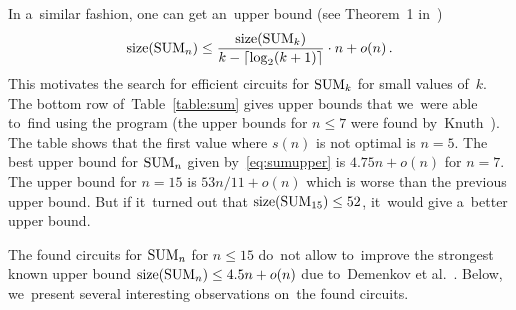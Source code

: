 In a~similar fashion, one can get an~upper bound (see Theorem~1 in~\cite{DBLP:conf/date/Kulikov18})
\begin{equation}\label{eq:sumupper}
\operatorname{size}(\operatorname{SUM}_n) \le \frac{\operatorname{size}(\operatorname{SUM}_k)}{k-\lceil \log_2(k+1) \rceil} \cdot n + o(n) \, .
\end{equation}
This motivates the search for efficient circuits
for $\operatorname{SUM}_k$ for small values of~$k$. The bottom row
of~Table~\ref{table:sum} gives upper bounds that
we~were able to~find using the program
(the upper bounds for $n \le 7$ were found
by~Knuth~\cite{Knuth:2008:ACP:1377542}).
The table shows that the first value where $s(n)$ is not
optimal is $n=5$. The best upper bound for $\operatorname{SUM}_n$ given
by~\eqref{eq:sumupper} is $4.75n+o(n)$ for $n=7$. The upper
bound for $n=15$ is $53n/11+o(n)$ which is worse than the
previous upper bound. But if it~turned out that
$\operatorname{size}(\operatorname{SUM}_{15}) \le 52$,
it~would give a~better upper bound.

The found circuits for $\operatorname{SUM}_n$ for $n \le 15$
do~not allow to~improve the strongest known upper bound
$\operatorname{size}(\operatorname{SUM}_n) \le 4.5n+o(n)$ due to~Demenkov et al.~\cite{DBLP:journals/ipl/DemenkovKKY10}. Below,
we~present several interesting observations on~the found circuits.

